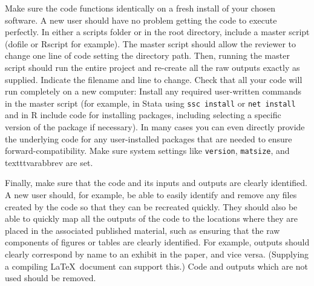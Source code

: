 Make sure the code functions identically on a fresh install of your chosen software.
A new user should have no problem getting the code to execute perfectly.
In either a scripts folder or in the root directory,
include a master script (dofile or Rscript for example).
The master script should allow the reviewer
to change one line of code setting the directory path.
Then, running the master script should run the entire project
and re-create all the raw outputs exactly as supplied.
Indicate the filename and line to change.
Check that all your code will run completely on a new computer:
Install any required user-written commands in the master script
(for example, in Stata using \texttt{ssc install} or \texttt{net install}
and in R include code for installing packages,
including selecting a specific version of the package if necessary).
In many cases you can even directly provide the underlying code
for any user-installed packages that are needed to ensure forward-compatibility.
Make sure system settings like \texttt{version}, \texttt{matsize}, and texttt{varabbrev} are set.

Finally, make sure that the code and its inputs and outputs are clearly identified.
A new user should, for example, be able to easily identify and remove
any files created by the code so that they can be recreated quickly.
They should also be able to quickly map all the outputs of the code
to the locations where they are placed in the associated published material,
such as ensuring that the raw components of figures or tables are clearly identified.
For example, outputs should clearly correspond by name to an exhibit in the paper, and vice versa.
(Supplying a compiling \LaTeX\ document can support this.)
Code and outputs which are not used should be removed.
